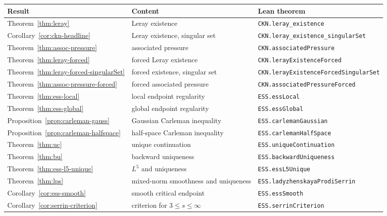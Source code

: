 \documentclass[11pt,letterpaper]{article}
\numberwithin{equation}{section}
\theoremstyle{plain}
\theoremstyle{definition}
\theoremstyle{remark}
\begin{document}
\begin{center}
\small
\begin{tabular}{lll}
Result & Content & Lean theorem\\
\hline
Theorem~\ref{thm:leray} & Leray existence & \texttt{CKN.leray\_existence}\\
Corollary~\ref{cor:ckn-headline} & Leray existence, singular set & \texttt{CKN.leray\_existence\_singularSet}\\
Theorem~\ref{thm:assoc-pressure} & associated pressure & \texttt{CKN.associatedPressure}\\
Theorem~\ref{thm:leray-forced} & forced Leray existence & \texttt{CKN.lerayExistenceForced}\\
Theorem~\ref{thm:leray-forced-singularSet} & forced existence, singular set & \texttt{CKN.lerayExistenceForcedSingularSet}\\
Theorem~\ref{thm:assoc-pressure-forced} & forced associated pressure & \texttt{CKN.associatedPressureForced}\\
\hline
Theorem~\ref{thm:ess-local} & local endpoint regularity & \texttt{ESS.essLocal}\\
Theorem~\ref{thm:ess-global} & global endpoint regularity & \texttt{ESS.essGlobal}\\
Proposition~\ref{prop:carleman-gauss} & Gaussian Carleman inequality & \texttt{ESS.carlemanGaussian}\\
Proposition~\ref{prop:carleman-halfspace} & half-space Carleman inequality & \texttt{ESS.carlemanHalfSpace}\\
Theorem~\ref{thm:uc} & unique continuation & \texttt{ESS.uniqueContinuation}\\
Theorem~\ref{thm:bu} & backward uniqueness & \texttt{ESS.backwardUniqueness}\\
Theorem~\ref{thm:ess-l5-unique} & $L^5$ and uniqueness & \texttt{ESS.essL5Unique}\\
Theorem~\ref{thm:lps} & mixed-norm smoothness and uniqueness & \texttt{ESS.ladyzhenskayaProdiSerrin}\\
Corollary~\ref{cor:ess-smooth} & smooth critical endpoint & \texttt{ESS.essSmooth}\\
Corollary~\ref{cor:serrin-criterion} & criterion for $3\le s\le\infty$ & \texttt{ESS.serrinCriterion}\\
\end{tabular}
\end{center}
\end{document}
